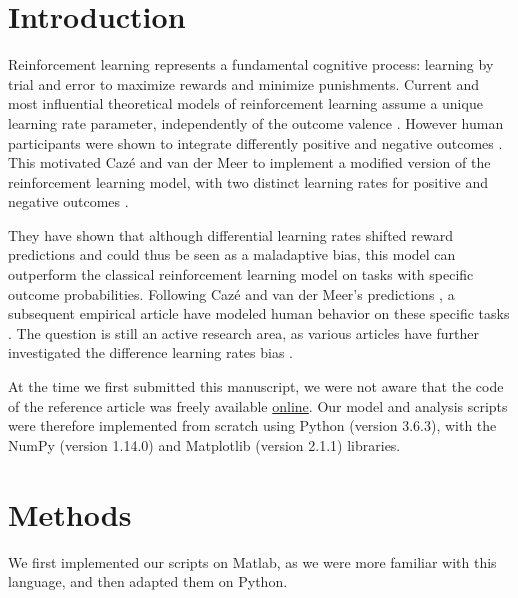 \documentclass[10pt,a4paper,onecolumn]{article}
\begin{document}
\hypertarget{introduction}{%
\section{Introduction}\label{introduction}}

Reinforcement learning represents a fundamental cognitive process:
learning by trial and error to maximize rewards and minimize
punishments. Current and most influential theoretical models of
reinforcement learning assume a unique learning rate parameter,
independently of the outcome valence \cite{sutton1998introduction, o2004dissociable, behrens2007learning}. However
human participants were shown to integrate differently positive and
negative outcomes \cite{frank2004carrot, frank2007genetic, sharot2011unrealistic}. This
motivated Cazé and van der Meer to implement a modified version of the
reinforcement learning model, with two distinct learning rates for
positive and negative outcomes \cite{caze2013adaptive}.

They have shown that although differential learning rates shifted reward
predictions and could thus be seen as a maladaptive bias, this model can
outperform the classical reinforcement learning model on tasks with
specific outcome probabilities. Following Cazé and van der Meer's
predictions \cite{caze2013adaptive}, a subsequent empirical article have modeled human behavior
on these specific tasks \cite{gershman2015learning}. The question
is still an active research area, as various articles have further
investigated the difference learning rates bias
\cite{garrett2014robust, moutsiana2015human, shah2016pessimistic, 
garrett2017optimistic, lefebvre2017behavioural, palminteri2017confirmation}.

At the time we first submitted this manuscript, we were not aware that the
 code of the reference article was freely available \href{https://github.com/rcaze/13_02CaVa}{online}. 
Our model and analysis scripts 
were therefore implemented from scratch using Python (version 3.6.3), with 
the NumPy (version 1.14.0) and Matplotlib (version 2.1.1) libraries.


\hypertarget{methods}{%
\section{Methods}\label{methods}}

We first implemented our scripts on Matlab, as we were more familiar
with this language, and then adapted them on Python.
\end{document}
